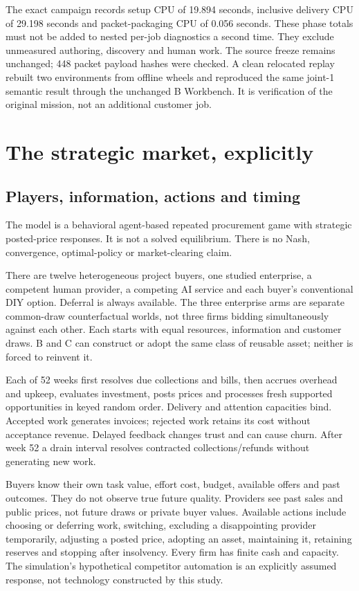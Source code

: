 \documentclass[11pt,a4paper]{article}
\begin{document}
The exact campaign records setup CPU of 19.894 seconds, inclusive delivery CPU of 29.198 seconds
and packet-packaging CPU of 0.056 seconds. These phase totals must not be added to nested
per-job diagnostics a second time. They exclude unmeasured authoring, discovery and human work.
The source freeze remains unchanged; 448 packet payload hashes were checked.
A clean relocated replay rebuilt two environments from offline wheels and reproduced the same
joint-1 semantic result through the unchanged B Workbench. It is verification of the original
mission, not an additional customer job.

\section{The strategic market, explicitly}
\subsection{Players, information, actions and timing}
The model is a behavioral agent-based repeated procurement game with strategic posted-price
responses. It is not a solved equilibrium. There is no Nash, convergence, optimal-policy or
market-clearing claim.

There are twelve heterogeneous project buyers, one studied enterprise, a competent human provider,
a competing AI service and each buyer's conventional DIY option. Deferral is always available.
The three enterprise arms are separate common-draw counterfactual worlds, not three firms bidding
simultaneously against each other. Each starts with equal resources, information and customer draws.
B and C can construct or adopt the same class of reusable asset; neither is forced to reinvent it.

Each of 52 weeks first resolves due collections and bills, then accrues overhead and upkeep,
evaluates investment, posts prices and processes fresh supported opportunities in keyed random
order. Delivery and attention capacities bind. Accepted work generates invoices; rejected work
retains its cost without acceptance revenue. Delayed feedback changes trust and can cause churn.
After week 52 a drain interval resolves contracted collections/refunds without generating new work.

Buyers know their own task value, effort cost, budget, available offers and past outcomes.
They do not observe true future quality. Providers see past sales and public prices, not future
draws or private buyer values. Available actions include choosing or deferring work, switching,
excluding a disappointing provider temporarily, adjusting a posted price, adopting an asset,
maintaining it, retaining reserves and stopping after insolvency.
Every firm has finite cash and capacity. The simulation's hypothetical competitor automation is
an explicitly assumed response, not technology constructed by this study.
\end{document}
